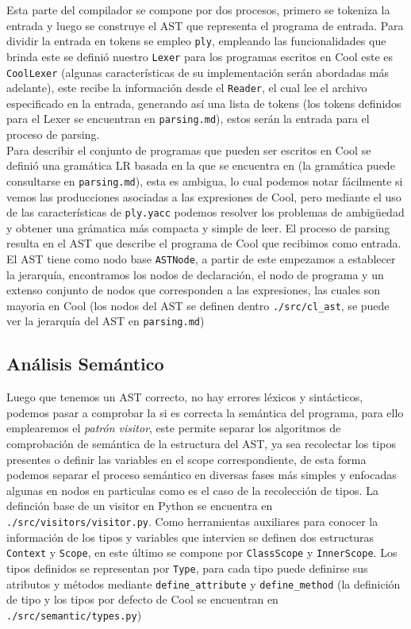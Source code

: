 \documentclass{article}
\begin{document}
Esta parte del compilador se compone por dos procesos, primero se tokeniza la entrada y luego se construye el AST que representa el programa de entrada. Para dividir la entrada en tokens se empleo \verb|ply|, empleando las funcionalidades que brinda este se defini\'o nuestro \verb|Lexer| para los programas escritos en Cool este es \verb|CoolLexer| (algunas caracter\'isticas de su implementaci\'on ser\'an abordadas m\'as adelante), este recibe la informaci\'on desde el \verb|Reader|, el cual lee el archivo especificado en la entrada, generando as\'i una lista de tokens (los tokens definidos para el Lexer se encuentran en \verb|parsing.md|), estos ser\'an la entrada para el proceso de parsing.\\

Para describir el conjunto de programas que pueden ser escritos en Cool se defini\'o una gram\'atica LR basada en la que se encuentra en \cite{1} (la gram\'atica puede consultarse en \verb|parsing.md|), esta es ambigua, lo cual podemos notar f\'acilmente si vemos las producciones asociadas a las expresiones de Cool, pero mediante el uso de las caracter\'isticas de \verb|ply.yacc| podemos resolver los problemas de ambig\"uedad y obtener una gr\'amatica m\'as compacta y simple de leer. El proceso de parsing resulta en el AST que describe el programa de Cool que recibimos como entrada. El AST tiene como nodo base \verb|ASTNode|, a partir de este empezamos a establecer la jerarqu\'ia, encontramos los nodos de declaraci\'on, el nodo de programa y un extenso conjunto de nodos que corresponden a las expresiones, las cuales son mayoria en Cool (los nodos del AST se definen dentro \verb|./src/cl_ast|, se puede ver la jerarqu\'ia del AST en \verb|parsing.md|)

\subsection{An\'alisis Sem\'antico}

Luego que tenemos un AST correcto, no hay errores l\'exicos y sint\'acticos, podemos pasar a comprobar la si es correcta la sem\'antica del programa, para ello emplearemos el \textit{patr\'on visitor}, este permite separar los algoritmos de comprobaci\'on de sem\'antica de la estructura del AST, ya sea recolectar los tipos presentes o definir las variables en el scope correspondiente, de esta forma podemos separar el proceso sem\'antico en diversas fases m\'as simples y enfocadas algunas en nodos en particulas como es el caso de la recolecci\'on de tipos. La definci\'on base de un visitor en Python se encuentra en \verb|./src/visitors/visitor.py|. Como herramientas auxiliares para conocer la informaci\'on de los tipos y variables que intervien se definen dos estructuras \verb|Context| y \verb|Scope|, en este \'ultimo se compone por \verb|ClassScope| y \verb|InnerScope|. Los tipos definidos se representan por \verb|Type|, para cada tipo puede definirse sus atributos y m\'etodos mediante \verb|define_attribute| y \verb|define_method| (la definici\'on de tipo y los tipos por defecto de Cool se encuentran en \verb|./src/semantic/types.py|)
\end{document}
